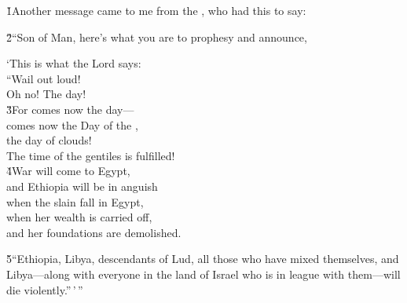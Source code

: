 \v{1}Another message came to me from the , who had this to say:

\v{2}``Son of Man, here's what you are to prophesy and announce,

\begin{poetry}
\poeml `This is what the Lord  says: \\
\poeml ``Wail out loud! \\
\poemll    Oh no! The day! \\
\poeml \v{3}For comes now the day--- \\
\poemll    comes now the Day of the , \\
\poeml the day of clouds! \\
\poemll    The time of the gentiles is fulfilled! \\
\poeml \v{4}War will come to Egypt, \\
\poemll    and Ethiopia will be in anguish \\
\poeml when the slain fall in Egypt, \\
\poemll    when her wealth is carried off, \\
\poemlll       and her foundations are demolished.
\end{poetry}

\v{5}``Ethiopia, Libya, descendants of Lud, all those who have mixed themselves, and Libya---along with everyone in the land of Israel who is in league with them---will die violently.''\,'\,''

